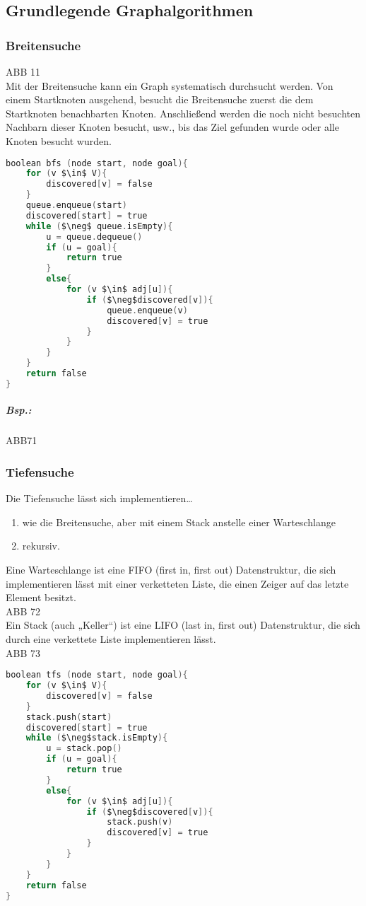 \subsection{Grundlegende Graphalgorithmen}

\subsubsection{Breitensuche}\parskp
ABB 11\\
Mit der Breitensuche kann ein Graph systematisch durchsucht werden. Von einem Startknoten ausgehend, besucht die Breitensuche zuerst die dem Startknoten benachbarten Knoten. Anschließend werden die noch nicht besuchten Nachbarn dieser Knoten besucht, usw., bis das Ziel gefunden wurde oder alle Knoten besucht wurden.

\begin{lstlisting}[language=C]
boolean bfs (node start, node goal){
	for (v $\in$ V){
		discovered[v] = false
	}
	queue.enqueue(start)
	discovered[start] = true
	while ($\neg$ queue.isEmpty){
		u = queue.dequeue()
		if (u = goal){
			return true
		}
		else{
			for (v $\in$ adj[u]){
				if ($\neg$discovered[v]){
					queue.enqueue(v)
					discovered[v] = true
				}
			}
		}
	}
	return false
}
\end{lstlisting}
\subparagraph{Bsp.:} \parskp
ABB71

\subsubsection{Tiefensuche}
Die Tiefensuche lässt sich implementieren…
\begin{enumerate}
\item wie die Breitensuche, aber mit einem Stack anstelle einer Warteschlange
\item rekursiv.
\end{enumerate}
Eine Warteschlange ist eine FIFO (first in, first out) Datenstruktur, die sich implementieren lässt mit einer verketteten Liste, die einen Zeiger auf das letzte Element besitzt.\\
ABB 72\\
Ein Stack (auch „Keller“) ist eine LIFO (last in, first out) Datenstruktur, die sich durch eine verkettete Liste implementieren lässt.\\
ABB 73

\begin{lstlisting}[language=C]
boolean tfs (node start, node goal){
	for (v $\in$ V){
		discovered[v] = false
	}
	stack.push(start)
	discovered[start] = true
	while ($\neg$stack.isEmpty){
		u = stack.pop()
		if (u = goal){
			return true
		}
		else{
			for (v $\in$ adj[u]){
				if ($\neg$discovered[v]){
					stack.push(v)
					discovered[v] = true
				}
			}
		}
	}
	return false
}
\end{lstlisting}

